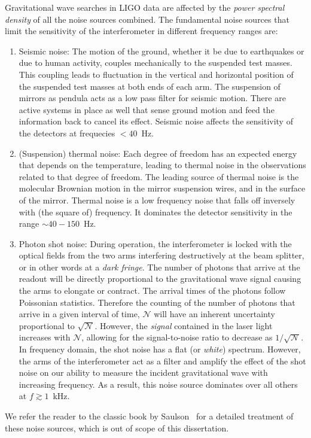 Gravitational wave searches in LIGO data are affected by the {\it power
spectral density} of all the noise sources combined. The fundamental noise 
sources that limit the sensitivity of the interferometer in different frequency
ranges are:
% 
\begin{enumerate}
 \item Seismic noise:
 The motion of the ground, whether it be due to earthquakes or due to human 
 activity, couples mechanically to the suspended test masses. This coupling
 leads to fluctuation in the vertical and horizontal position of the suspended
 test masses at both ends of each arm. The suspension of mirrors as pendula acts 
 as a low pass filter for seismic motion. There are active systems in place as
 well that sense ground motion and feed the information back to cancel its
 effect. Seismic noise affects the sensitivity of the detectors at frequecies
 $< 40$~Hz.
 \item (Suspension) thermal noise:
 Each degree of freedom has an expected energy that depends on the temperature,
 leading to thermal noise in the observations related to that degree of freedom.
 The leading source of thermal noise is the molecular Brownian motion in the
 mirror suspension wires, and in the surface of the mirror. Thermal noise is 
 a low frequency noise that falls off inversely with (the square of) frequency. 
 It dominates  the detector sensitivity in the range $\sim 40-150$~Hz.
 \item Photon shot noise:
 During operation, the interferometer is locked 
 with the optical fields from the two arms interfering destructively at the
 beam splitter, or in other words at a {\it dark fringe}. The number of photons
 that arrive at the readout will be directly proportional to the gravitational
 wave signal causing the arms to elongate or contract. The arrival times of the
 photons follow Poissonian statistics. Therefore the counting of the number of
 photons that arrive in a given interval of time, $\mathcal{N}$ will have an 
 inherent uncertainty proportional to $\sqrt{\mathcal{N}}$. However, the {\it signal}
 contained in the laser light increases with $\mathcal{N}$, allowing for the 
 signal-to-noise ratio to decrease as $1/\sqrt{\mathcal{N}}$.
 In frequency domain, the shot noise has a flat (or {\it white}) spectrum. 
 However, the arms of the interferometer act as a filter and amplify the effect
 of the shot noise on our ability to measure the incident gravitational wave
 with increasing frequency. As a result, this noise source dominates over all
 others at $f\gtrsim 1$~kHz.
\end{enumerate}
% 
We refer the reader to the classic book by Saulson~\cite{Saulson:1995zi} for a
detailed treatment of these noise sources, which is out of scope of this 
dissertation. 

